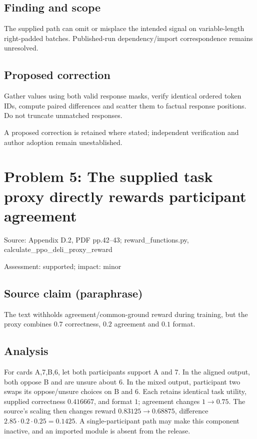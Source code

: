 \documentclass[11pt]{article}
\begin{document}
\subsection*{Finding and scope}

The supplied path can omit or misplace the intended signal on variable-length right-padded batches. Published-run dependency/import correspondence remains unresolved.

\subsection*{Proposed correction}

Gather values using both valid response masks, verify identical ordered token IDs, compute paired differences and scatter them to factual response positions. Do not truncate unmatched responses.

A proposed correction is retained where stated; independent verification and author adoption remain unestablished.

\section*{Problem 5: The supplied task proxy directly rewards participant agreement}

Source: Appendix D.2, PDF pp.42–43; reward\_functions.py, calculate\_ppo\_deli\_proxy\_reward

Assessment: supported; impact: minor

\subsection*{Source claim (paraphrase)}

The text withholds agreement/common-ground reward during training, but the proxy combines \(0.7\) correctness, \(0.2\) agreement and \(0.1\) format.

\subsection*{Analysis}

For cards A,7,B,6, let both participants support A and 7. In the aligned output, both oppose B and are unsure about 6. In the mixed output, participant two swaps its oppose/unsure choices on B and 6. Each retains identical task utility, supplied correctness \(0.416667\), and format \(1\); agreement changes \(1\to0.75\). The source’s scaling then changes reward \(0.83125\to0.68875\), difference \(2.85\cdot0.2\cdot0.25=0.1425\). A single-participant path may make this component inactive, and an imported module is absent from the release.
\end{document}
